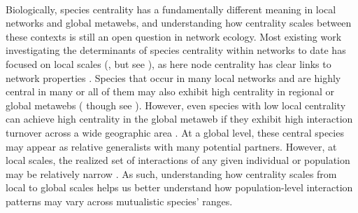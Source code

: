 \paragraph*{}
Biologically, species centrality has a fundamentally different meaning in local networks and global metawebs, and understanding how centrality scales between these contexts is still an open question in network ecology. Most existing work investigating the determinants of species centrality within networks to date has focused on local scales (\parencite{maia2019plant}, but see \parencite{moulatlet2023species}), as here node centrality has clear links to network properties \parencite{gonzalez2010centrality, maia2019plant, cagua2019keystoneness}. Species that occur in many local networks and are highly central in many or all of them may also exhibit high centrality in regional or global metawebs (\parencite{estrada2007characterization, martins2025determinants} though see \parencite{dallas2022parasite}). However, even species with low local centrality can achieve high centrality in the global metaweb if they exhibit high interaction turnover across a wide geographic area \parencite{carstensen2014beta, simanonok2014partitioning}. At a global level, these central species may appear as relative generalists with many potential partners. However, at local scales, the realized set of interactions of any given individual or population may be relatively narrow \parencite{bison2015upscaling, arroyo2023intraspecific}. As such, understanding how centrality scales from local to global scales helps us better understand how population-level interaction patterns may vary across mutualistic species' ranges. 




